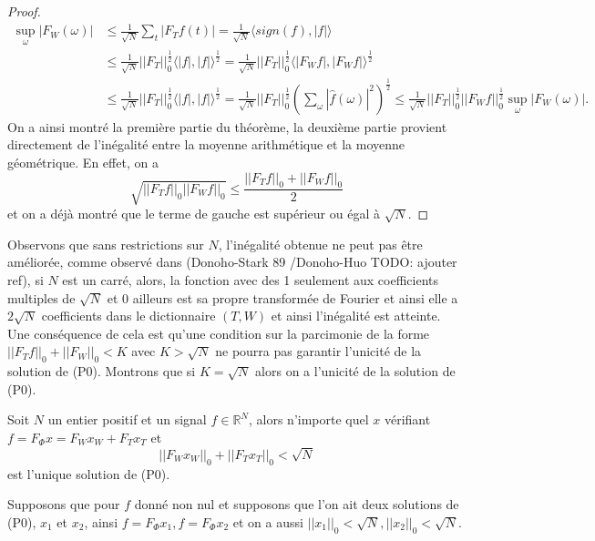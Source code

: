 \begin{exemple}
\begin{proof}
		\begin{align}
			\sup_\omega|F_W(\omega)| &\leq \frac{1}{\sqrt{N}}\sum_t |F_Tf (t)| = \frac{1}{\sqrt{N}}\langle sign(f), |f| \rangle \\
			&\leq  \frac{1}{\sqrt{N}} ||F_T||_0^{\frac{1}{2}} \langle |f|, |f| \rangle ^{\frac{1}{2}} =  \frac{1}{\sqrt{N}} ||F_T||_0^{\frac{1}{2}} \langle |F_W f|, |F_Wf| \rangle ^{\frac{1}{2}} \\
			&\leq   \frac{1}{\sqrt{N}} ||F_T||_0^{\frac{1}{2}} \langle |f|, |f| \rangle ^{\frac{1}{2}} =  \frac{1}{\sqrt{N}} ||F_T||_0^{\frac{1}{2}} \left( \sum_\omega|\hat{f}(\omega)|^2 \right)^{\frac{1}{2}} \leq \frac{1}{\sqrt{N}}||F_T||_0^{\frac{1}{2}} ||F_W f||_0^{\frac{1}{2}} \sup_\omega |F_W(\omega)|.
		\end{align}
		On a ainsi montré la première partie du théorème, la deuxième partie provient directement de l'inégalité entre la moyenne arithmétique et la moyenne géométrique.
		En effet, on a 
		\begin{equation}
			\sqrt{||F_T f||_0 ||F_W f||_0} \leq \frac{||F_T f||_0 + ||F_W f||_0}{2}
		\end{equation}
	et on a déjà montré que le terme de gauche est supérieur ou égal à $\sqrt{N}$.
	\end{proof}
	Observons que sans restrictions sur $N$, l'inégalité obtenue ne peut pas être améliorée, comme observé dans (Donoho-Stark 89 /Donoho-Huo TODO: ajouter ref), si $N$ est un carré, alors, la fonction avec des 1 seulement aux coefficients multiples de $\sqrt{N}$ et 0 ailleurs est sa propre transformée de Fourier et ainsi elle a $2\sqrt{N}$ coefficients dans le dictionnaire $(T,W)$ et ainsi l'inégalité est atteinte.
	Une conséquence de cela est qu'une condition sur la parcimonie de la forme $||F_T f||_0 + ||F_W||_0 < K$ avec $K>\sqrt{N}$ ne pourra pas garantir l'unicité de la solution de (P0).
	Montrons que si $K = \sqrt{N}$ alors on a l'unicité de la solution de (P0).
	\begin{theoreme}\label{th:Incert2}
		Soit $N$ un entier positif et un signal $f \in \mathbb{R}^N$, alors n'importe quel $x$ vérifiant $f = F_\Phi x = F_W x_W + F_T x_T$ et 
		\begin{equation}\label{eq:Incert1}
			||F_W x_W||_0 + ||F_T x_T||_0 < \sqrt{N}
		\end{equation}
		est l'unique solution de (P0).
	\end{theoreme}
	Supposons que pour $f$ donné non nul et supposons que l'on ait deux solutions de (P0), $x_1$ et $x_2$, ainsi $f = F_\Phi x_1, f = F_\Phi x_2$ et on a aussi $||x_1||_0 < \sqrt{N}, ||x_2||_0 < \sqrt{N}$.

\end{exemple}

